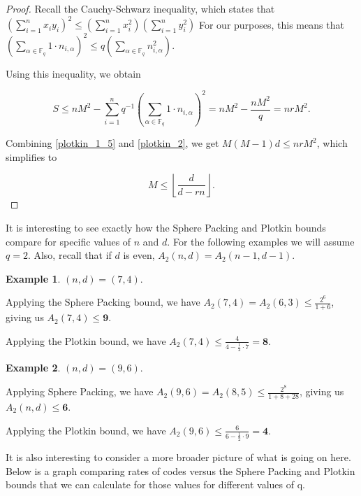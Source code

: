\documentclass{article}
\numberwithin{theorem}{subsection}
\theoremstyle{definition}
\newtheorem{exmp}{Example}
\numberwithin{exmp}{subsection}
\theoremstyle{definition}
\numberwithin{defn}{subsection}
\theoremstyle{definition}
\numberwithin{claim}{subsection}
\begin{document}
\begin{proof}
Recall the Cauchy-Schwarz inequality, which states that $\left(\sum_{i=1}^n x_i y_i \right )^2 \le \left(\sum_{i=1}^n x_i^2 \right ) \left(\sum_{i=1}^n y_i^2 \right )$
For our purposes, this means that $\left(\sum_{\alpha\in\mathbb{F}_q} 1\cdot n_{i,\alpha} \right )^2 \le q \left(\sum_{\alpha\in\mathbb{F}_q} n_{i,\alpha}^2 \right )$.

Using this inequality, we obtain

\begin{equation} \label{plotkin_2}
S \le nM^2 - \sum_{i=1}^n q^{-1} \left(\sum_{\alpha\in\mathbb{F}_q} 1\cdot n_{i,\alpha} \right )^2 = nM^2 - \frac{nM^2}{q} = nrM^2.
\end{equation}

Combining \ref{plotkin_1_5} and \ref{plotkin_2}, we get $M(M-1)d \le nrM^2$, which simplifies to 

\begin{equation}
M \le \left\lfloor \frac{d}{d-rn} \right\rfloor.
\end{equation}

\end{proof}

It is interesting to see exactly how the Sphere Packing and Plotkin bounds compare for specific values of $n$ and $d$.  For the following examples we will assume $q=2$.    
Also, recall that if $d$ is even, $A_2(n,d) = A_2(n-1,d-1)$.  

\begin{exmp}
$(n,d) = (7,4)$.

Applying the Sphere Packing bound, we have $A_2(7,4) = A_2(6,3) \le \frac{2^6}{1 + 6}$, 
giving us $A_2(7,4) \le \textbf{9}$.

Applying the Plotkin bound, we have $A_2(7,4) \le \frac{4}{4-\frac{1}{2}\cdot7} = \textbf{8}$.

\end{exmp}

\begin{exmp}
$(n,d) = (9,6)$.

Applying Sphere Packing, we have  $A_2(9,6) = A_2(8,5) \le \frac{2^8}{1+8+28}$, giving us $A_2(n,d) \le \textbf{6}$.

Applying the Plotkin bound, we have $A_2(9,6) \le \frac{6}{6-\frac{1}{2}\cdot9} = \textbf{4}$.
\end{exmp}

It is also interesting to consider a more broader picture of what is going on here.  Below is a graph comparing rates of codes versus the Sphere Packing and Plotkin bounds
that we can calculate for those values for different values of q.  
\end{document}
